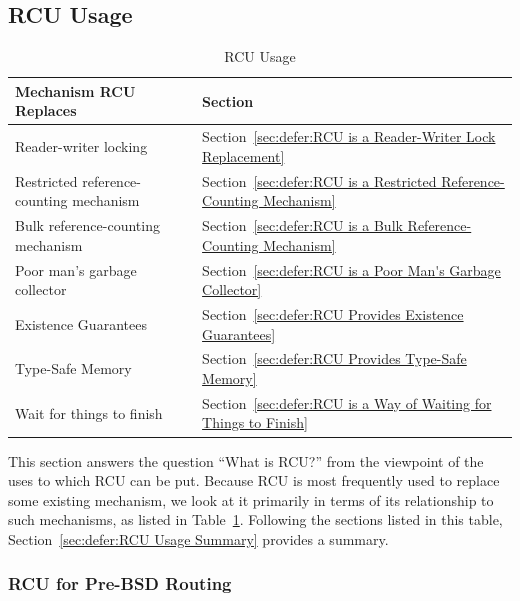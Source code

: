 
\subsection{RCU Usage}
\label{sec:defer:RCU Usage}

\begin{table}[tb]
\renewcommand*{\arraystretch}{1.2}
\centering
\small
\begin{tabular}{ll}
\toprule
Mechanism RCU Replaces & Section \\
\midrule
Reader-writer locking &
	Section~\ref{sec:defer:RCU is a Reader-Writer Lock Replacement} \\
Restricted reference-counting mechanism &
	Section~\ref{sec:defer:RCU is a Restricted Reference-Counting Mechanism} \\
Bulk reference-counting mechanism &
	Section~\ref{sec:defer:RCU is a Bulk Reference-Counting Mechanism} \\
Poor man's garbage collector &
	Section~\ref{sec:defer:RCU is a Poor Man's Garbage Collector} \\
Existence Guarantees &
	Section~\ref{sec:defer:RCU Provides Existence Guarantees} \\
Type-Safe Memory &
	Section~\ref{sec:defer:RCU Provides Type-Safe Memory} \\
Wait for things to finish &
	Section~\ref{sec:defer:RCU is a Way of Waiting for Things to Finish} \\
\bottomrule
\end{tabular}
\caption{RCU Usage}
\label{tab:defer:RCU Usage}
\end{table}

This section answers the question ``What is RCU?'' from the viewpoint
of the uses to which RCU can be put.
Because RCU is most frequently used to replace some existing mechanism,
we look at it primarily in terms of its relationship to such mechanisms,
as listed in Table~\ref{tab:defer:RCU Usage}.
Following the sections listed in this table,
Section~\ref{sec:defer:RCU Usage Summary} provides a summary.

\subsubsection{RCU for Pre-BSD Routing}
\label{sec:defer:RCU for Pre-BSD Routing}

